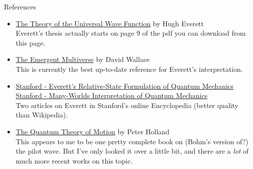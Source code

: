 \documentclass[9pt,usenames,dvipsnames]{beamer}
\begin{document}
\begin{frame}[t]{References}
\vspace{6pt}
\begin{itemize}
\item \href{http://ucispace.lib.uci.edu/handle/10575/1302}
    {The Theory of the Universal Wave Function} by Hugh Everett\\
    Everett's thesis actually starts on page 9 of the pdf you can download
    from this page.

\vspace{8pt}
\item \href{https://www.goodreads.com/book/show/13688768-emergent-multiverse}
    {The Emergent Multiverse} by David Wallace\\
    This is currently the best up-to-date reference for Everett's
    interpretation.

\vspace{8pt}
\item \href{http://plato.stanford.edu/entries/qm-everett/\#7}
    {Stanford - Everett's Relative-State Formulation of Quantum Mechanics}\\
    \href{http://plato.stanford.edu/entries/qm-manyworlds/}
    {Stanford - Many-Worlds Interpretation of Quantum Mechanics}\\
    Two articles on Everett in Stanford's online Encyclopedia
    (better quality than Wikipedia).

\vspace{8pt}
\item \href{https://www.goodreads.com/book/show/1334044.The\_Quantum\_Theory\_of\_Motion}{The Quantum Theory of Motion} by Peter Holland\\
    This appears to me to be one pretty complete book on (Bohm's version of?)
    the pilot wave. But I've only looked it over a little bit, and there
    are a {\it lot} of much more recent works on this topic.
\end{itemize}
\end{frame}
\end{document}
